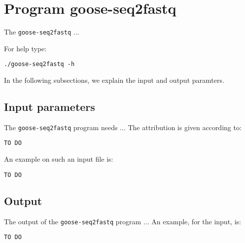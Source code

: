 \section{Program goose-seq2fastq}
The \texttt{goose-seq2fastq} ...

For help type:
\begin{lstlisting}
./goose-seq2fastq -h
\end{lstlisting}
In the following subsections, we explain the input and output paramters.

\subsection*{Input parameters}

The \texttt{goose-seq2fastq} program needs ...
The attribution is given according to:
\begin{lstlisting}
TO DO
\end{lstlisting}

An example on such an input file is:
\begin{lstlisting}
TO DO
\end{lstlisting}

\subsection*{Output}
The output of the \texttt{goose-seq2fastq} program ...
An example, for the input, is:
\begin{lstlisting}
TO DO
\end{lstlisting}
